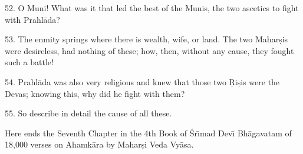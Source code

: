 52. O Muni! What was it that led the best of the Munis, the two ascetics to fight with Prahl\=ada?

53. The enmity springs where there is wealth, wife, or land. The two Mahar\d{s}is were desireless, had nothing of these; how, then, without any cause, they fought such a battle!

54. Prahl\=ada was also very religious and knew that those two \d{R}i\d{s}is were the Devas; knowing this, why did he fight with them?

55. So describe in detail the cause of all these.

Here ends the Seventh Chapter in the 4th Book of \'Sr\={\i}mad Dev\={\i} Bh\=agavatam of 18,000 verses on Ahamk\=ara by Mahar\d{s}i Veda Vy\=asa.



